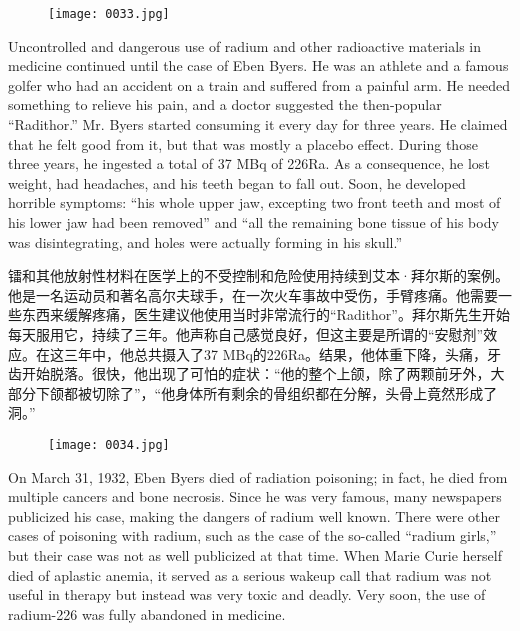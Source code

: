 \documentclass[dvipsnames, svgnames,a4paper,11pt]{article}
\begin{document}
\begin{figure}[htbp]
      \centering
      \texttt{[image: 0033.jpg]}
       \label{fig21}
\end{figure}

Uncontrolled and dangerous use of radium and other radioactive materials in medicine continued until the case of Eben Byers. He was an athlete and a famous golfer who had an accident on a train and suffered from a painful arm. He needed something to relieve his pain, and a doctor suggested the then-popular “Radithor.” Mr. Byers started consuming it every day for three years. He claimed that he felt good from it, but that was mostly a placebo effect. During those three years, he ingested a total of 37 MBq of 226Ra. As a consequence, he lost weight, had headaches, and his teeth began to fall out. Soon, he developed horrible symptoms: “his whole upper jaw, excepting two front teeth and most of his lower jaw had been removed” and “all the remaining bone tissue of his body was disintegrating, and holes were actually forming in his skull.”

镭和其他放射性材料在医学上的不受控制和危险使用持续到艾本·拜尔斯的案例。他是一名运动员和著名高尔夫球手，在一次火车事故中受伤，手臂疼痛。他需要一些东西来缓解疼痛，医生建议他使用当时非常流行的“Radithor”。拜尔斯先生开始每天服用它，持续了三年。他声称自己感觉良好，但这主要是所谓的“安慰剂”效应。在这三年中，他总共摄入了37 MBq的226Ra。结果，他体重下降，头痛，牙齿开始脱落。很快，他出现了可怕的症状：“他的整个上颌，除了两颗前牙外，大部分下颌都被切除了”，“他身体所有剩余的骨组织都在分解，头骨上竟然形成了洞。”

\begin{figure}[htbp]
      \centering
      \texttt{[image: 0034.jpg]}
       \label{fig22}
\end{figure}

On March 31, 1932, Eben Byers died of radiation poisoning; in fact, he died from multiple cancers and bone necrosis. Since he was very famous, many newspapers publicized his case, making the dangers of radium well known. There were other cases of poisoning with radium, such as the case of the so-called “radium girls,” but their case was not as well publicized at that time. When Marie Curie herself died of aplastic anemia, it served as a serious wakeup call that radium was not useful in therapy but instead was very toxic and deadly. Very soon, the use of radium-226 was fully abandoned in medicine.
\end{document}
